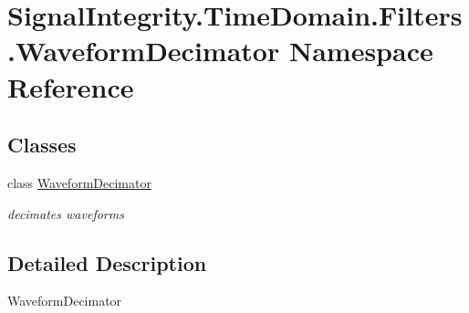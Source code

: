 \hypertarget{namespaceSignalIntegrity_1_1TimeDomain_1_1Filters_1_1WaveformDecimator}{}\section{Signal\+Integrity.\+Time\+Domain.\+Filters.\+Waveform\+Decimator Namespace Reference}
\label{namespaceSignalIntegrity_1_1TimeDomain_1_1Filters_1_1WaveformDecimator}
\subsection*{Classes}
\begin{DoxyCompactItemize}
\item 
class \hyperlink{classSignalIntegrity_1_1TimeDomain_1_1Filters_1_1WaveformDecimator_1_1WaveformDecimator}{Waveform\+Decimator}
\begin{DoxyCompactList}\small\item\em decimates waveforms \end{DoxyCompactList}\end{DoxyCompactItemize}


\subsection{Detailed Description}
\begin{DoxyVerb}WaveformDecimator\end{DoxyVerb}
 